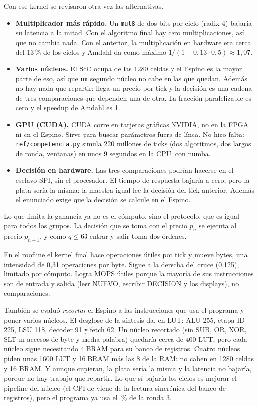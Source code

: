\documentclass[11pt,letterpaper]{article}
\begin{document}
Con ese kernel se revisaron otra vez las alternativas.
\begin{itemize}
\item \textbf{Multiplicador más rápido.} Un \texttt{mul8} de dos bits por ciclo (radix 4) bajaría su
latencia a la mitad. Con el algoritmo final hay cero multiplicaciones, así que no cambia nada. Con el
anterior, la multiplicación en hardware era cerca del 13\,\% de los ciclos y Amdahl da como máximo
$1/(1 - 0{,}13 \cdot 0{,}5) \approx 1{,}07$.
\item \textbf{Varios núcleos.} El SoC ocupa \LCSw{} de las 1280 celdas y el Espino es la mayor parte de
eso, así que un segundo núcleo no cabe en las \LCLibres{} que quedan. Además no hay nada que
repartir: llega un precio por tick y la decisión es una cadena de tres comparaciones que dependen una de
otra. La fracción paralelizable es cero y el speedup de Amdahl es 1.
\item \textbf{GPU (CUDA).} CUDA corre en tarjetas gráficas NVIDIA, no en la FPGA ni en el Espino. Sirve
para buscar parámetros fuera de línea. No hizo falta: \texttt{ref/competencia.py} simula 220 millones
de ticks (dos algoritmos, dos largos de ronda, \NVentanas{} ventanas) en unos 9 segundos en la CPU, con
numba.
\item \textbf{Decisión en hardware.} Las tres comparaciones podrían hacerse en el esclavo SPI, sin el
procesador. El tiempo de respuesta bajaría a cero, pero la plata sería la misma: la maestra igual lee
la decisión del tick anterior. Además el enunciado exige que la decisión se calcule en el Espino.
\end{itemize}

Lo que limita la ganancia ya no es el cómputo, sino el protocolo, que es igual para todos los grupos.
La decisión que se toma con el precio $p_n$ se ejecuta al precio $p_{n+1}$, y como $q \le 63$ entrar
y salir toma dos órdenes.

En el roofline el kernel final hace \ExtOpsTick{} operaciones útiles por tick y mueve
\ExtBytesTick{} bytes, una intensidad de 0,31 operaciones por byte. Sigue a la derecha del cruce
(0,125), limitado por cómputo. Logra \ExtMops{} MOPS útiles porque la mayoría de sus instrucciones
son de entrada y salida (leer NUEVO, escribir DECISION y los displays), no comparaciones.

También se evaluó \emph{recortar} el Espino a las instrucciones que usa el programa y poner varios
núcleos. El desglose de la síntesis da, en LUT: ALU 255, etapa ID 225, LSU 118, decoder 91 y fetch 62.
Un núcleo recortado (sin SUB, OR, XOR, SLT ni accesos de byte y media palabra) quedaría cerca de 400
LUT, pero cada núcleo sigue necesitando 4 BRAM para su banco de registros. Cuatro núcleos piden unas
1600 LUT y 16 BRAM más las 8 de la RAM: no caben en 1280 celdas y 16 BRAM. Y aunque cupieran, la plata
sería la misma y la latencia no bajaría, porque no hay trabajo que repartir. Lo que sí bajaría los
ciclos es mejorar el pipeline del núcleo (el CPI de \ExtCPI{} viene de la lectura sincrónica del banco
de registros), pero el programa ya usa el \ExtPctRtres\,\% de la ronda 3.
\end{document}
